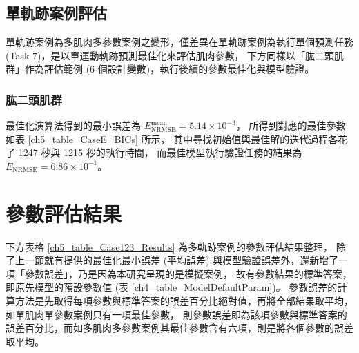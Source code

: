 \clearpage

\subsection{單軌跡案例評估}
單軌跡案例為多肌肉多參數案例之變形，僅差異在單軌跡案例為執行單個預測任務 (Task 7)，是以單運動軌跡預測最佳化來評估肌肉參數，
下方同樣以「肱二頭肌群」作為評估範例 (6 個設計變數)，執行後續的參數最佳化與模型驗證。

\subsubsection{肱二頭肌群}
最佳化演算法得到的最小誤差為 $E^\mathrm{mean}_\mathrm{NRMSE} = 5.14 \times 10^{-3}$，
所得到對應的最佳參數如表 \ref{ch5_table_CaseE_BICs} 所示，
其中尋找初始值與最佳解的迭代過程各花了 1247 秒與 1215 秒的執行時間，
而最佳模型執行驗證任務的結果為 $E_\mathrm{NRMSE} = 6.86 \times 10^{-1}$。

\begin{table}[!ht]
    \caption[單軌跡案例：肱二頭肌群的最佳參數]{單軌跡案例於肱二頭肌群的最佳參數}
	\label{ch5_table_CaseE_BICs}
	\centering
\end{table}

\section{參數評估結果}
下方表格 \ref{ch5_table_Case123_Results} 為多軌跡案例的參數評估結果整理，
除了上一節就有提供的最佳化最小誤差 (平均誤差) 與模型驗證誤差外，還新增了一項「參數誤差」，乃是因為本研究呈現的是模擬案例，
故有參數結果的標準答案，即原先模型的預設參數值 (表 \ref{ch4_table_ModelDefaultParam})。
參數誤差的計算方法是先取得每項參數與標準答案的誤差百分比絕對值，再將全部結果取平均，如單肌肉單參數案例只有一項最佳參數，
則參數誤差即為該項參數與標準答案的誤差百分比，而如多肌肉多參數案例其最佳參數含有六項，則是將各個參數的誤差取平均。

